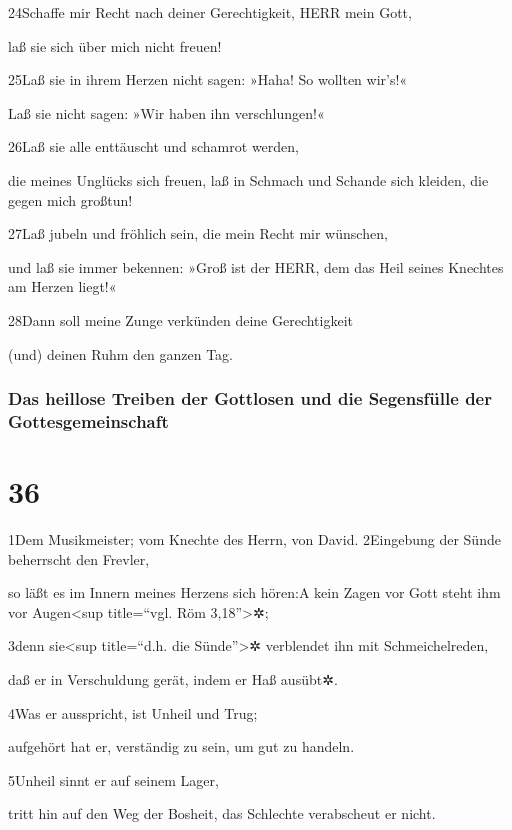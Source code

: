 24Schaffe mir Recht nach deiner Gerechtigkeit, HERR mein Gott,

laß sie sich über mich nicht freuen!

25Laß sie in ihrem Herzen nicht sagen: »Haha! So wollten wir's!«

Laß sie nicht sagen: »Wir haben ihn verschlungen!«

26Laß sie alle enttäuscht und schamrot werden,

die meines Unglücks sich freuen, laß in Schmach und Schande sich
kleiden, die gegen mich großtun!

27Laß jubeln und fröhlich sein, die mein Recht mir wünschen,

und laß sie immer bekennen: »Groß ist der HERR, dem das Heil seines
Knechtes am Herzen liegt!«

28Dann soll meine Zunge verkünden deine Gerechtigkeit

(und) deinen Ruhm den ganzen Tag.

\hypertarget{das-heillose-treiben-der-gottlosen-und-die-segensfuxfclle-der-gottesgemeinschaft}{%
\subsubsection{Das heillose Treiben der Gottlosen und die Segensfülle
der
Gottesgemeinschaft}\label{das-heillose-treiben-der-gottlosen-und-die-segensfuxfclle-der-gottesgemeinschaft}}

\hypertarget{section-35}{%
\section{36}\label{section-35}}

1Dem Musikmeister; vom Knechte des Herrn, von David. 2Eingebung der
Sünde beherrscht den Frevler,

so läßt es im Innern meines Herzens sich hören:{A} kein Zagen vor Gott
steht ihm vor Augen\textless sup title=``vgl. Röm 3,18''\textgreater✲;

3denn sie\textless sup title=``d.h. die Sünde''\textgreater✲ verblendet
ihn mit Schmeichelreden,

daß er in Verschuldung gerät, indem er Haß ausübt✲.

4Was er ausspricht, ist Unheil und Trug;

aufgehört hat er, verständig zu sein, um gut zu handeln.

5Unheil sinnt er auf seinem Lager,

tritt hin auf den Weg der Bosheit, das Schlechte verabscheut er nicht.

